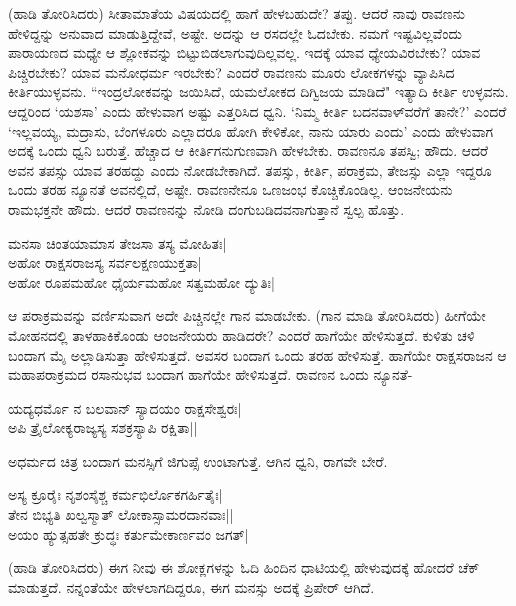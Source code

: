 (ಹಾಡಿ ತೋರಿಸಿದರು) ಸೀತಾಮಾತೆಯ ವಿಷಯದಲ್ಲಿ ಹಾಗೆ ಹೇಳಬಹುದೇ? ತಪ್ಪು. ಆದರೆ ನಾವು ರಾವಣನು ಹೇಳಿದ್ದನ್ನು ಅನುವಾದ ಮಾಡುತ್ತಿದ್ದೇವೆ, ಅಷ್ಟೇ. ಅದನ್ನು ಆ ರಸದಲ್ಲೇ ಓದಬೇಕು. ನಮಗೆ ಇಷ್ಟವಿಲ್ಲವೆಂದು ಪಾರಾಯಣದ ಮಧ್ಯೇ ಆ ಶ್ಲೋಕವನ್ನು ಬಿಟ್ಟುಬಿಡಲಾಗುವುದಿಲ್ಲವಲ್ಲ. ಇದಕ್ಕೆ ಯಾವ ಧ್ಯೇಯವಿರಬೇಕು? ಯಾವ ಪಿಚ್ಚಿರಬೇಕು? ಯಾವ ಮನೋಧರ್ಮ ಇರಬೇಕು? ಎಂದರೆ ರಾವಣನು ಮೂರು ಲೋಕಗಳನ್ನು ವ್ಯಾಪಿಸಿದ ಕೀರ್ತಿಯುಳ್ಳವನು. ``ಇಂದ್ರಲೋಕವನ್ನು ಜಯಿಸಿದೆ, ಯಮಲೋಕದ ದಿಗ್ವಿಜಯ ಮಾಡಿದೆ" ಇತ್ಯಾದಿ ಕೀರ್ತಿ ಉಳ್ಳವನು. ಆದ್ದರಿಂದ `ಯಶಸಾ' ಎಂದು ಹೇಳುವಾಗ ಅಷ್ಟು ಎತ್ತರಿಸಿದ ಧ್ವನಿ. `ನಿಮ್ಮ ಕೀರ್ತಿ ಬದನವಾಳ್‍ವರೆಗೆ ತಾನೇ?' ಎಂದರೆ `ಇಲ್ಲವಯ್ಯ, ಮದ್ರಾಸು, ಬೆಂಗಳೂರು ಎಲ್ಲಾದರೂ ಹೋಗಿ ಕೇಳಿಕೋ, ನಾನು ಯಾರು ಎಂದು' ಎಂದು ಹೇಳುವಾಗ ಅದಕ್ಕೆ ಒಂದು ಧ್ವನಿ ಬರುತ್ತೆ. ಹೆಚ್ಚಾದ ಆ ಕೀರ್ತಿಗನುಗುಣವಾಗಿ ಹೇಳಬೇಕು. ರಾವಣನೂ ತಪಸ್ವಿ; ಹೌದು. ಆದರೆ ಅವನ ತಪಸ್ಸು ಯಾವ ತರಹದ್ದು ಎಂದು ನೋಡಬೇಕಾಗಿದೆ. ತಪಸ್ಸು, ಕೀರ್ತಿ, ಪರಾಕ್ರಮ, ತೇಜಸ್ಸು ಎಲ್ಲಾ ಇದ್ದರೂ ಒಂದು ತರಹ ನ್ಯೂನತೆ ಅವನಲ್ಲಿದೆ, ಅಷ್ಟೇ. ರಾವಣನೇನೂ ಒಣಜಂಭ ಕೊಚ್ಚಿಕೊಂಡಿಲ್ಲ. ಆಂಜನೇಯನು ರಾಮಭಕ್ತನೇ ಹೌದು. ಆದರೆ ರಾವಣನನ್ನು ನೋಡಿ ದಂಗುಬಡಿದವನಾಗುತ್ತಾನೆ ಸ್ವಲ್ಪ ಹೊತ್ತು. 

\begin{shloka} 
ಮನಸಾ ಚಿಂತಯಾಮಾಸ ತೇಜಸಾ ತಸ್ಯ ಮೋಹಿತಃ|\label{192}\\ 
ಅಹೋ ರಾಕ್ಷಸರಾಜಸ್ಯ ಸರ್ವಲಕ್ಷಣಯುಕ್ತತಾ|\\ 
ಅಹೋ ರೂಪಮಹೋ ಧೈರ್ಯಮಹೋ ಸತ್ವಮಹೋ ದ್ಯುತಿಃ|
\end{shloka}

ಆ ಪರಾಕ್ರಮವನ್ನು ವರ್ಣಿಸುವಾಗ ಅದೇ ಪಿಚ್ಚಿನಲ್ಲೇ ಗಾನ ಮಾಡಬೇಕು. (ಗಾನ ಮಾಡಿ ತೋರಿಸಿದರು) ಹೀಗೆಯೇ ಮೋಹನದಲ್ಲಿ ತಾಳಹಾಕಿಕೊಂಡು ಆಂಜನೇಯರು ಹಾಡಿದರೇ? ಎಂದರೆ ಹಾಗೆಯೇ ಹೇಳಿಸುತ್ತದೆ. ಕುಳಿತು ಚಳಿ ಬಂದಾಗ ಮೈ ಅಲ್ಲಾಡಿಸುತ್ತಾ ಹೇಳಿಸುತ್ತದೆ. ಅವಸರ ಬಂದಾಗ ಒಂದು ತರಹ ಹೇಳಿಸುತ್ತೆ. ಹಾಗೆಯೇ ರಾಕ್ಷಸರಾಜನ ಆ ಮಹಾಪರಾಕ್ರಮದ ರಸಾನುಭವ ಬಂದಾಗ ಹಾಗೆಯೇ ಹೇಳಿಸುತ್ತದೆ. ರಾವಣನ ಒಂದು ನ್ಯೂನತೆ- 

\begin{shloka}
ಯದ್ಯಧರ್ಮೊ ನ ಬಲವಾನ್‍ ಸ್ಯಾದಯಂ ರಾಕ್ಷಸೇಶ್ವರಃ|\label{192b}\\ 
ಅಪಿ ತ್ರೈಲೋಕ್ಯರಾಜ್ಯಸ್ಯ ಸಶಕ್ರಸ್ಯಾಪಿ ರಕ್ಷಿತಾ||
\end{shloka}

ಅಧರ್ಮದ ಚಿತ್ರ ಬಂದಾಗ ಮನಸ್ಸಿಗೆ ಜಿಗುಪ್ಸೆ ಉಂಟಾಗುತ್ತೆ. ಆಗಿನ ಧ್ವನಿ, ರಾಗವೇ ಬೇರೆ. 

\begin{shloka}
ಅಸ್ಯ ಕ್ರೂರೈಃ ನೃಶಂಸೈಶ್ಚ\label{192a} ಕರ್ಮಭಿರ್ಲೊಕಗರ್ಹಿತೈಃ|\\ 
ತೇನ ಬಿಭ್ಯತಿ ಖಲ್ವಸ್ಮಾತ್‍ ಲೋಕಾಸ್ಸಾಮರದಾನವಾಃ||\\ 
ಅಯಂ ಹ್ಯುತ್ಸಹತೇ ಕ್ರುದ್ಧಃ ಕರ್ತುಮೇಕಾರ್ಣವಂ ಜಗತ್‍|
\end{shloka}


(ಹಾಡಿ ತೋರಿಸಿದರು) ಈಗ ನೀವು ಈ ಶೋಕ್ಲಗಳನ್ನು ಓದಿ ಹಿಂದಿನ ಧಾಟಿಯಲ್ಲಿ ಹೇಳುವುದಕ್ಕೆ ಹೋದರೆ ಚೆಕ್‍ ಮಾಡುತ್ತದೆ. ನನ್ನಂತೆಯೇ ಹೇಳಲಾಗದಿದ್ದರೂ, ಈಗ ಮನಸ್ಸು ಅದಕ್ಕೆ ಪ್ರಿಪೇರ್‍ ಆಗಿದೆ. 

